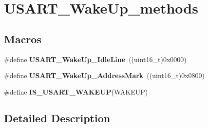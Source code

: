 \hypertarget{group___u_s_a_r_t___wake_up__methods}{\section{U\-S\-A\-R\-T\-\_\-\-Wake\-Up\-\_\-methods}
\label{group___u_s_a_r_t___wake_up__methods}
}
\subsection*{Macros}
\begin{DoxyCompactItemize}
\item 
\hypertarget{group___u_s_a_r_t___wake_up__methods_ga9646d71590d5cef29ee12da0bb431d92}{\#define {\bfseries U\-S\-A\-R\-T\-\_\-\-Wake\-Up\-\_\-\-Idle\-Line}~((uint16\-\_\-t)0x0000)}\label{group___u_s_a_r_t___wake_up__methods_ga9646d71590d5cef29ee12da0bb431d92}

\item 
\hypertarget{group___u_s_a_r_t___wake_up__methods_ga9f63c1671060682adee91b9a2f3202e4}{\#define {\bfseries U\-S\-A\-R\-T\-\_\-\-Wake\-Up\-\_\-\-Address\-Mark}~((uint16\-\_\-t)0x0800)}\label{group___u_s_a_r_t___wake_up__methods_ga9f63c1671060682adee91b9a2f3202e4}

\item 
\#define {\bfseries I\-S\-\_\-\-U\-S\-A\-R\-T\-\_\-\-W\-A\-K\-E\-U\-P}(W\-A\-K\-E\-U\-P)
\end{DoxyCompactItemize}


\subsection{Detailed Description}


